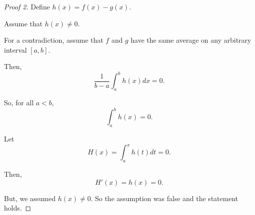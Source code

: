 \documentclass[../hw7.tex]{subfiles}
\begin{document}
\begin{proof}[Proof 2]
    Define $h(x)=f(x)-g(x)$.

    Assume that $h(x)\neq0$.

    For a contradiction, assume that $f$ and $g$ have the same average on any arbitrary interval $[a,b]$.

    Then,
    \[\frac{1}{b-a}\int_{a}^{b}h(x)dx=0.\]
    
    So, for all $a<b$, \[\int_{a}^{b}h(x)=0.\]

    Let \[H(x)=\int_{a}^{x}h(t)dt=0.\]

    Then, \[H'(x)=h(x)=0.\]

    But, we assumed $h(x)\neq0$. So the assumption was false and the statement holds.











\end{proof}
\end{document}
